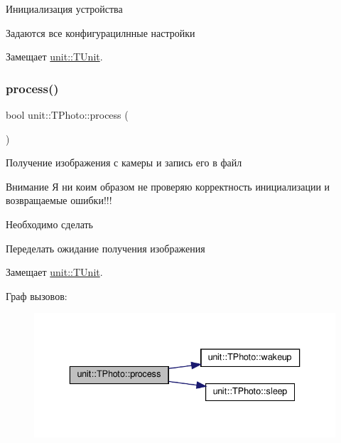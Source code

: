 Инициализация устройства 



 Задаются все конфигурацилнные настройки 

Замещает \hyperlink{classunit_1_1_t_unit_afc001dd57ba88e571e6b650a416b76a5}{unit\+::\+T\+Unit}.

\mbox{\label{classunit_1_1_t_photo_a8323fa27bff29d883e9903b74c341605}} 
\subsubsection{\texorpdfstring{process()}{process()}}
{\footnotesize\ttfamily bool unit\+::\+T\+Photo\+::process (\begin{DoxyParamCaption}{ }\end{DoxyParamCaption})\hspace{0.3cm}{\ttfamily [virtual]}}



Получение изображения с камеры и запись его в файл 



 \begin{DoxyAttention}{Внимание}
Я ни коим образом не проверяю корректность инициализации и возвращаемые ошибки!!! 
\end{DoxyAttention}
\begin{DoxyRefDesc}{Необходимо сделать}
\item[\hyperlink{todo__todo000011}{Необходимо сделать}]Переделать ожидание получения изображения \end{DoxyRefDesc}


Замещает \hyperlink{classunit_1_1_t_unit_a108691c8b988d97c65237c83a31db706}{unit\+::\+T\+Unit}.

Граф вызовов\+:\nopagebreak
\begin{figure}[H]
\begin{center}
\leavevmode
\includegraphics[width=336pt]{classunit_1_1_t_photo_a8323fa27bff29d883e9903b74c341605_cgraph}
\end{center}
\end{figure}
\mbox{\label{classunit_1_1_t_photo_acfdae485260a64864e779cacd15644f7}} 
